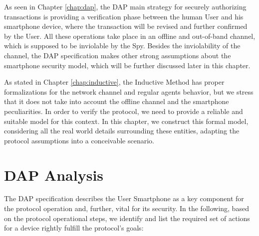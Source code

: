 \label{chap:formal-phones}

As seen in Chapter \ref{chap:dap}, the DAP main strategy for securely authorizing transactions is providing a verification phase between the human User and his smartphone device, where the transaction will be revised and further confirmed by the User. All these operations take place in an offline and out-of-band channel, which is supposed to be inviolable by the Spy. Besides the inviolability of the channel, the DAP specification makes other strong assumptions about the smartphone security model, which will be further discussed later in this chapter.

As stated in Chapter \ref{chap:inductive}, the Inductive Method has proper formalizations for the network channel and regular agents behavior, but we stress that it does not take into account the offline channel and the smartphone peculiarities. In order to verify the protocol, we need to provide a reliable and suitable model for this context. In this chapter, we construct this formal model, considering all the real world details surrounding these entities, adapting the protocol assumptions into a conceivable scenario.





\section{DAP Analysis}
The DAP specification describes the User Smartphone as a key component for the protocol operation and, further, vital for its security. In the following, based on the protocol operational steps, we identify and list the required set of actions for a device rightly fulfill the protocol's goals:

